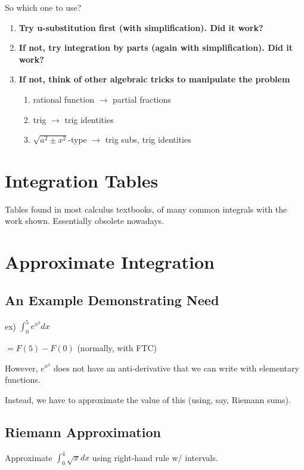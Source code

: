 \documentclass{article}
\begin{document}
So which one to use?
\begin{enumerate}
    \item \textbf{Try u-substitution first (with simplification). Did it work?}
    \item \textbf{If not, try integration by parts (again with simplification). Did it work?}
    \item \textbf{If not, think of other algebraic tricks to manipulate the problem}
    \begin{enumerate}
        \item rational function $\rightarrow$ partial fractions
        
        \item trig $\rightarrow$ trig identities
        
        \item $\sqrt{a^2 \pm x^2}$-type $\rightarrow$ trig subs, trig identities
    \end{enumerate}
\end{enumerate}

\section{Integration Tables}
Tables found in most calculus textbooks, of many common integrals with the work shown. Essentially obsolete nowadays.

\section{Approximate Integration}

\subsection{An Example Demonstrating Need}

ex) $\int_{0}^{5} e^{x^{2}} dx$

$ = F(5)-F(0)$ (normally, with FTC)

However, $e^{x^{2}}$ does not have an anti-derivative that we can write with elementary functions.

Instead, we have to approximate the value of this (using, say, Riemann sums).

\subsection{Riemann Approximation}
Approximate
$\int_{0}^{4} \sqrt{x} dx$ 
using right-hand rule w/ intervals.
\end{document}
